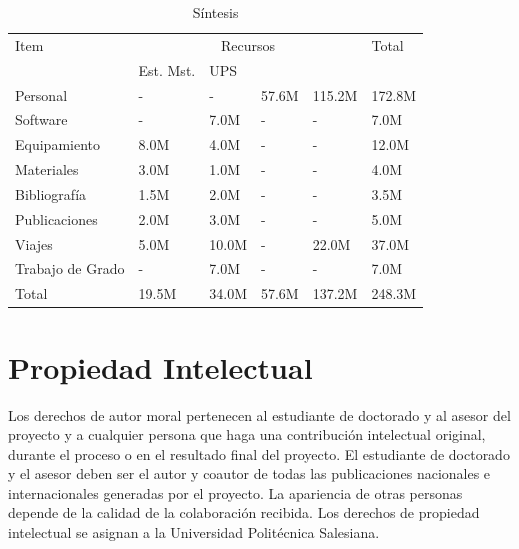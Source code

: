 \documentclass[12pt,a4paper]{article}
\begin{document}
\begin{table}[H]
\caption{Síntesis}
\begin{tabular}{|p{7.0cm}|p{1.1cm}|p{1.1cm}|p{1.1cm}|p{1.1cm}|p{1.1cm}|} \hline
Item & \multicolumn{4}{|c|}{Recursos} & Total \\ \cline{2-5}
  & Est. Mst. & UPS \\ \hline \hline

Personal          & -    & -    & 57.6M & 115.2M & 172.8M \\ \hline
Software          & -    & 7.0M & -     & -      & 7.0M   \\ \hline
Equipamiento      & 8.0M & 4.0M & -     & -      & 12.0M  \\ \hline
Materiales        & 3.0M & 1.0M & -     & -      & 4.0M   \\ \hline
Bibliografía      & 1.5M & 2.0M & -     & -      & 3.5M   \\ \hline
Publicaciones     & 2.0M & 3.0M & -     & -      & 5.0M   \\ \hline
Viajes            & 5.0M & 10.0M& -     & 22.0M  &37.0M   \\ \hline
Trabajo de Grado  & -    & 7.0M & -     & -      & 7.0M   \\ \hline
Total             &19.5M & 34.0M& 57.6M & 137.2M & 248.3M \\ \hline
\end{tabular}
\end{table}


\section{Propiedad Intelectual}
Los derechos de autor moral pertenecen al estudiante de doctorado y al asesor del proyecto y a cualquier persona que haga una contribución intelectual original, durante el proceso o en el resultado final del proyecto. El estudiante de doctorado y el asesor deben ser el autor y coautor de todas las publicaciones nacionales e internacionales generadas por el proyecto. La apariencia de otras personas depende de la calidad de la colaboración recibida. Los derechos de propiedad intelectual se asignan a la Universidad Politécnica Salesiana. 
\\


\vfill
\end{document}
